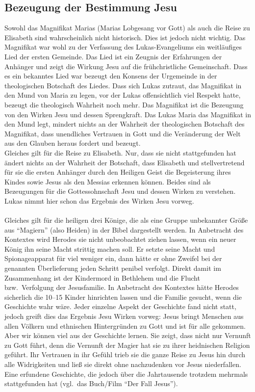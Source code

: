 \subsection{Bezeugung der Bestimmung Jesu}
Sowohl das Magnifikat Marias (Marias Lobgesang vor Gott) als auch die Reise zu Elisabeth sind wahrscheinlich nicht historisch. Dies ist jedoch nicht wichtig. Das Magnifikat war wohl zu der Verfassung des Lukas-Evangeliums ein weitläufiges Lied der ersten Gemeinde. Das Lied ist ein Zeugnis der Erfahrungen der Anhänger und zeigt die Wirkung Jesu auf die frühchristliche Gemeinschaft. Dass es ein bekanntes Lied war bezeugt den Konsens der Urgemeinde in der theologischen Botschaft des Liedes. Dass sich Lukas zutraut, das Magnifikat in den Mund von Maria zu legen, vor der Lukas offensichtlich viel Respekt hatte, bezeugt die theologisch Wahrheit noch mehr. Das Magnifikat ist die Bezeugung von den Wirken Jesu und dessen Sprengkraft. Das Lukas Maria das Magnifikat in den Mund legt, mindert nichts an der Wahrheit der theologischen Botschaft des Magnifikat, dass unendliches Vertrauen in Gott und die Veränderung der Welt aus den Glauben heraus fordert und bezeugt.
\\ 
Gleiches gilt für die Reise zu Elisabeth. Nur, dass sie nicht stattgefunden hat ändert nichts an der Wahrheit der Botschaft, dass Elisabeth und stellvertretend für sie die ersten Anhänger durch den Heiligen Geist die Begeisterung ihres Kindes sowie Jesus als den Messias erkennen können. Beides sind als Bezeugungen für die Gottessohnschaft Jesu und dessen Wirken zu verstehen. Lukas nimmt hier schon das Ergebnis des Wirken Jesu vorweg. 
\\~\\
Gleiches gilt für die heiligen drei Könige, die als eine Gruppe unbekannter Größe aus ``Magiern'' (also Heiden) in der Bibel dargestellt werden. In Anbetracht des Kontextes wird Herodes sie nicht unbeobachtet ziehen lassen, wenn ein neuer König ihn seine Macht strittig machen soll. Er setzte seine Macht und Spionageapparat für viel weniger ein, dann hätte er ohne Zweifel bei der genannten Überlieferung jeden Schritt penibel verfolgt. Direkt damit im Zusammenhang ist der Kindermord in Bethlehem und die Flucht bzw.\ Verfolgung der Jesusfamilie. In Anbetracht des Kontextes hätte Herodes sicherlich die 10--15 Kinder hinrichten lassen und die Familie gesucht, wenn die Geschichte wahr wäre. Jeder einzelne Aspekt der Geschichte fand nicht statt, jedoch greift dies das Ergebnis Jesu Wirken vorweg: Jesus bringt Menschen aus allen Völkern und ethnischen Hintergründen zu Gott und ist für alle gekommen. Aber wir können viel aus der Geschichte lernen. Sie zeigt, dass nicht nur Vernunft zu Gott führt, denn die Vernunft der Magier hat sie zu ihrer heidnischen Religion geführt. Ihr Vertrauen in ihr Gefühl trieb sie die ganze Reise zu Jesus hin durch alle Widrigkeiten und ließ sie direkt ohne nachzudenken vor Jesus niederfallen. Eine erfundene Geschichte, die jedoch über die Jahrtausende trotzdem mehrmals stattgefunden hat (vgl.\ das Buch/Film ``Der Fall Jesus'').

